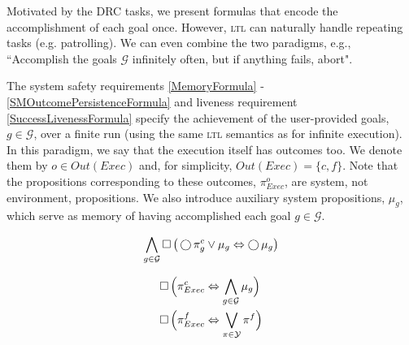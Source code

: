Motivated by the DRC tasks, we present formulas that encode the accomplishment of each goal once.
However, \textsc{ltl} can naturally handle repeating tasks (e.g. patrolling).
We can even combine the two paradigms, e.g.,
``Accomplish the goals $\mathcal{G}$ infinitely often, but if anything fails, abort".

The system safety requirements \eqref{MemoryFormula} - \eqref{SMOutcomePersistenceFormula} and liveness requirement \eqref{SuccessLivenessFormula} specify the achievement of the user-provided goals, $g \in \mathcal{G}$, over a finite run (using the same \textsc{ltl} semantics as for infinite execution).
In this paradigm, we say that the execution itself has outcomes too.
We denote them by $o \in Out(Exec)$ and, for simplicity, $Out(Exec) = \{ c, f \}$.
Note that the propositions corresponding to these outcomes, $\pi_{Exec}^o$, are system, not environment, propositions.
We also introduce auxiliary system propositions, $\mu_g$, which serve as memory \cite{Vasu2012IROS} of having accomplished each goal $g \in \mathcal{G}$.


\begin{equation}\label{MemoryFormula}
	\bigwedge \limits_{g \in \mathcal{G}} \operatorname{\Box} \big( \operatorname{\bigcirc} \pi_g^c \vee \mu_g \Leftrightarrow \operatorname{\bigcirc} \mu_g \big)
\end{equation}

\begin{subequations}
	\label{SMOutcomeFormulas}
	\begin{align}
		\operatorname{\Box} \Big( \pi_{Exec}^{c} &\Leftrightarrow \bigwedge \limits_{g \in \mathcal{G}} \mu_g \Big) \label{SuccessfulOutcomeFormula}\\
		\operatorname{\Box} \Big( \pi_{Exec}^{f} &\Leftrightarrow \bigvee \limits_{\pi \in \mathcal{Y}} \pi^f \Big) \label{FailedOutcomeFormula}	 
	\end{align}
\end{subequations}

